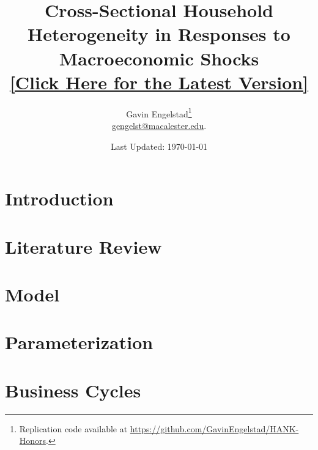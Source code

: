 \documentclass[11pt]{article}
\title{Cross-Sectional Household Heterogeneity in Responses to Macroeconomic Shocks \\ {\large \href{https://gavinengelstad.github.io/assets/pdf/hank/paper.pdf}{[Click Here for the Latest Version]}}}
\author{Gavin Engelstad\thanks{Replication code available at \url{https://github.com/GavinEngelstad/HANK-Honors}.} \\ \href{mailto:gengelst@macalester.edu}{gengelst@macalester.edu}.}
\date{Last Updated: \today}
\numberwithin{equation}{section} %
\numberwithin{figure}{section} %
\numberwithin{table}{section} %
\begin{document}
\maketitle

\begin{abstract}
\end{abstract}
\newpage

\section{Introduction} \label{sec:intro}


\section{Literature Review} \label{sec:lit-review}


\section{Model}
 \label{sec:model}

\section{Parameterization} \label{sec:params}


\section{Business Cycles} \label{sec:buis-cycs}

\end{document}
